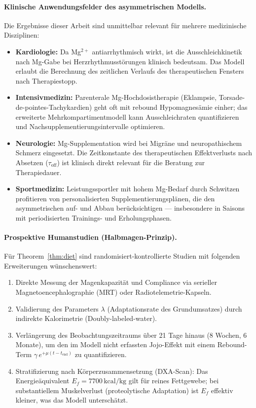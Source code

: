 ﻿\documentclass[12pt,a4paper]{article}
\theoremstyle{plain}
\theoremstyle{definition}
\theoremstyle{remark}
\begin{document}
\paragraph{Klinische Anwendungsfelder des asymmetrischen Modells.}
Die Ergebnisse dieser Arbeit sind unmittelbar relevant für mehrere
medizinische Disziplinen:
\begin{itemize}
  \item \textbf{Kardiologie:} Da Mg$^{2+}$ antiarrhythmisch wirkt, ist
        die Ausschleichkinetik nach Mg-Gabe bei Herzrhythmusstörungen
        klinisch bedeutsam. Das Modell erlaubt die Berechnung des
        zeitlichen Verlaufs des therapeutischen Fensters nach Therapiestopp.
  \item \textbf{Intensivmedizin:} Parenterale Mg-Hochdosistherapie
        (Eklampsie, Torsade-de-pointes-Tachykardien) geht oft mit rebound
        Hypomagnesämie einher; das erweiterte Mehrkompartimentmodell kann
        Ausschleichraten quantifizieren und Nachsupplementierungsintervalle
        optimieren.
  \item \textbf{Neurologie:} Mg-Supplementation wird bei Migräne und
        neuropathischem Schmerz eingesetzt. Die Zeitkonstante des
        therapeutischen Effektverlusts nach Absetzen ($\tau_\text{off}$)
        ist klinisch direkt relevant für die Beratung zur
        Therapiedauer.
  \item \textbf{Sportmedizin:} Leistungssportler mit hohem Mg-Bedarf
        durch Schwitzen profitieren von personalisierten
        Supplementierungsplänen, die den asymmetrischen auf- und
        Abbau berücksichtigen --- insbesondere in Saisons mit
        periodisierten Trainings- und Erholungsphasen.
\end{itemize}

\paragraph{Prospektive Humanstudien (Halbmagen-Prinzip).}
Für Theorem~\ref{thm:diet} sind randomi\-siert-kontrollierte Studien mit
folgenden Erweiterungen wünschenswert:
\begin{enumerate}[label=(\roman*)]
  \item Direkte Messung der Magenkapazität und Compliance via
        serieller Magnetoencephalographie (MRT) oder Radiotelemetrie-Kapseln.
  \item Validierung des Parameters $\lambda$ (Adaptationsrate des
        Grundumsatzes) durch indirekte Kalorimetrie (Doubly-labeled-water).
  \item Verlängerung des Beobachtungszeitraums über 21 Tage hinaus
        (8 Wochen, 6 Monate), um den im Modell nicht erfassten Jojo-Effekt
        mit einem Rebound-Term $\gamma \, e^{+\mu (t-t_\text{end})}$ zu
        quantifizieren.
  \item Stratifizierung nach Körperzusammensetzung (DXA-Scan): Das
        Energieäquivalent $E_f = 7700\,\text{kcal/kg}$ gilt für reines
        Fettgewebe; bei substantiellem Muskelverlust (proteolytische Adaptation)
        ist $E_f$ effektiv kleiner, was das Modell unterschätzt.
\end{enumerate}
\end{document}
